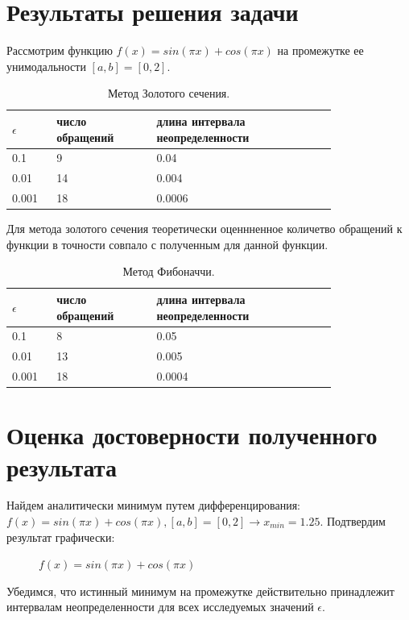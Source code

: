 \documentclass[main.tex]{subfiles}
\begin{document}
	
	\section{Результаты решения задачи}
	Рассмотрим функцию \newline$f(x) = sin(\pi x) + cos(\pi x)$ на промежутке ее унимодальности $[a, b] = [0, 2].$\\
	
	\begin{table}[h]
		\begin{tabular} { | p{0.1\linewidth} | p{0.25\linewidth} | p{0.45\linewidth} |}
			\hline
			$\epsilon$ & число обращений & длина интервала неопределенности  \\ \hline
			0.1 & 9 & 0.04  \\ \hline
			0.01 & 14 & 0.004  \\ \hline
			0.001 & 18 & 0.0006   \\ \hline
		\end{tabular}
		\caption{Метод Золотого сечения.}
	\end{table}
	Для метода золотого сечения теоретически оценнненное количетво обращений к функции в точности совпало с полученным для данной функции.
	
	\begin{table}[h]
		\begin{tabular} { | p{0.1\linewidth} | p{0.25\linewidth} | p{0.45\linewidth} |}
			\hline
			$\epsilon$ & число обращений & длина интервала неопределенности  \\ \hline
			0.1 & 8 & 0.05  \\ \hline
			0.01 & 13 & 0.005 \\ \hline
			0.001 & 18 &  0.0004  \\ \hline
		\end{tabular}
		\caption{Метод Фибоначчи.}
	\end{table}
	
	
	\section{Оценка достоверности полученного результата}
	Найдем аналитически минимум путем дифференцирования:
	$f(x) = sin(\pi x) + cos(\pi x), [a, b] = [0, 2] \rightarrow x_{min} = 1.25.$
	Подтвердим результат графически:
	\begin{figure}[H]
		\caption{$f(x) = sin(\pi x) + cos(\pi x)$}
		\label{function2}
	\end{figure}
	Убедимся, что истинный минимум на промежутке действительно принадлежит интервалам неопределенности для всех исследуемых значений $\epsilon$.\\
	
\end{document}

